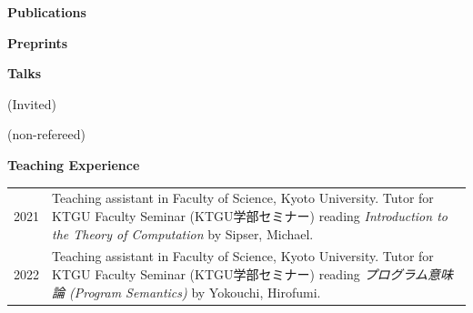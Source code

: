 \documentclass[a4paper,11pt,backend=luatex]{article} %
\newcommand*{\cvsection}[1]{%
  \Needspace{5\baselineskip}%
  \vspace{1.2\baselineskip}%
  {\raggedright          %
   \bfseries\large       %
   #1\par}               %
  \vspace{0.4\baselineskip}%
}
\begin{document}
\cvsection{Publications}
\begin{refsection}                      %
  \nocite{*} %
  \printbibliography[heading=none,keyword=published,resetnumbers=true]
\end{refsection}

\cvsection{Preprints}
\begin{refsection}
\nocite{*} %
  \printbibliography[heading=none,keyword=preprint,resetnumbers=true]
\end{refsection}

\cvsection{Talks}
(Invited)
\begin{refsection}
\nocite{*} %
  \printbibliography[heading=none,keyword=iv-talk,resetnumbers=true]
\end{refsection}

(non-refereed)
\begin{refsection}
\nocite{*} %
  \printbibliography[heading=none,keyword=nr-talk,resetnumbers=true]
\end{refsection}


\cvsection{Teaching Experience}
\noindent\begin{tabularx}{\textwidth}{@{}lX@{}}
  2021
  &
  Teaching assistant in Faculty of Science, Kyoto University.
  Tutor for KTGU Faculty Seminar (KTGU学部セミナー) reading \textit{Introduction to the Theory of Computation} by Sipser, Michael.
  \\
  2022
  &
  Teaching assistant in Faculty of Science, Kyoto University.
  Tutor for KTGU Faculty Seminar (KTGU学部セミナー) reading \textit{プログラム意味論 (Program Semantics) } by Yokouchi, Hirofumi.
\end{tabularx}
\end{document}
